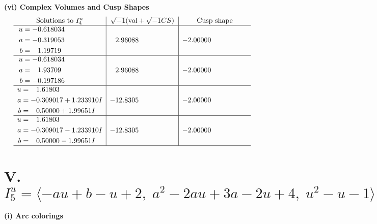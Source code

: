 \documentclass[1p]{elsarticle_modified}
\theoremstyle{definition}
\newcommand{\I}{\sqrt{-1}}
\begin{document}
\newpage\flushleft \textbf{(vi) Complex Volumes and Cusp Shapes}
$$\begin{array}{c|c|c}  
\text{Solutions to }I^u_{4}& \I (\text{vol} + \sqrt{-1}CS) & \text{Cusp shape}\\
 \hline 
\begin{aligned}
u &= -0.618034\phantom{ +0.000000I} \\
a &= -0.319053\phantom{ +0.000000I} \\
b &= \phantom{-}1.19719\phantom{ +0.000000I}\end{aligned}
 & \phantom{-}2.96088\phantom{ +0.000000I} & -2.00000\phantom{ +0.000000I} \\ \hline\begin{aligned}
u &= -0.618034\phantom{ +0.000000I} \\
a &= \phantom{-}1.93709\phantom{ +0.000000I} \\
b &= -0.197186\phantom{ +0.000000I}\end{aligned}
 & \phantom{-}2.96088\phantom{ +0.000000I} & -2.00000\phantom{ +0.000000I} \\ \hline\begin{aligned}
u &= \phantom{-}1.61803\phantom{ +0.000000I} \\
a &= -0.309017 + 1.233910 I \\
b &= \phantom{-}0.50000 + 1.99651 I\end{aligned}
 & -12.8305\phantom{ +0.000000I} & -2.00000\phantom{ +0.000000I} \\ \hline\begin{aligned}
u &= \phantom{-}1.61803\phantom{ +0.000000I} \\
a &= -0.309017 - 1.233910 I \\
b &= \phantom{-}0.50000 - 1.99651 I\end{aligned}
 & -12.8305\phantom{ +0.000000I} & -2.00000\phantom{ +0.000000I}\\
 \hline 
 \end{array}$$\newpage\newpage\renewcommand{\arraystretch}{1}
\centering \section*{V. $I^u_{5}= \langle - a u+b- u+2,\;a^2-2 a u+3 a-2 u+4,\;u^2- u-1 \rangle$}
\flushleft \textbf{(i) Arc colorings}\\
\end{document}
